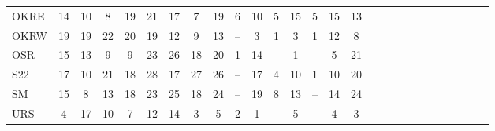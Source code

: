 \documentclass[varwidth=\maxdimen,border=1pt]{standalone}
\begin{document}
\begin{tabular*}{14cm}{ l @{\extracolsep{\fill}} *{26}{c} }
  OKRE &  14 &  10 &   8 &  19 &  21 &  17 &   7 &  19 &   6 &  10 &   5 &  15 &   5 &  15 &  13 \\ 
  OKRW &  19 &  19 &  22 &  20 &  19 &  12 &   9 &  13 & -- &   3 &   1 &   3 &   1 &  12 &   8 \\ 
  OSR &  15 &  13 &   9 &   9 &  23 &  26 &  18 &  20 &   1 &  14 & -- &   1 & -- &   5 &  21 \\ 
  S22 &  17 &  10 &  21 &  18 &  28 &  17 &  27 &  26 & -- &  17 &   4 &  10 &   1 &  10 &  20 \\ 
  SM &  15 &   8 &  13 &  18 &  23 &  25 &  18 &  24 & -- &  19 &   8 &  13 & -- &  14 &  24 \\ 
  URS &   4 &  17 &  10 &   7 &  12 &  14 &   3 &   5 &   2 &   1 & -- &   5 & -- &   4 &   3 \\ 
   \hline
\end{tabular*}

 
\end{document}
